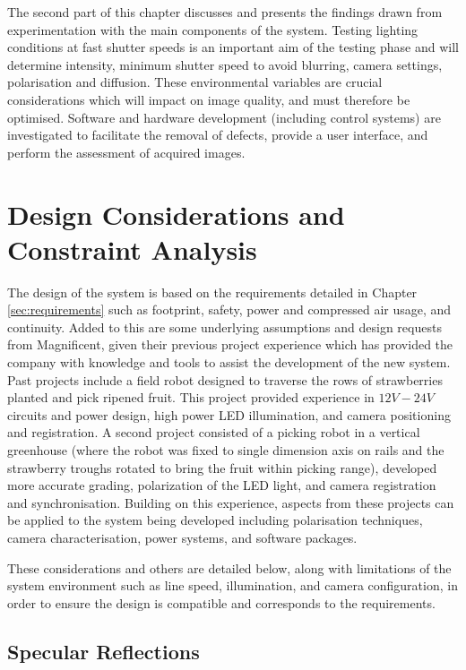 \documentclass[fleqn,twoside,12pt]{report}
\begin{document}
The second part of this chapter discusses and presents the findings drawn from experimentation with the main components of the system. Testing lighting conditions at fast shutter speeds is an important aim of the testing phase and will determine intensity, minimum shutter speed to avoid blurring, camera settings, polarisation and diffusion. These environmental variables are crucial considerations which will impact on image quality, and must therefore be optimised. Software and hardware development (including control systems) are investigated to facilitate the removal of defects, provide a user interface, and perform the assessment of acquired images.


\section{Design Considerations and Constraint Analysis}
\label{sec:challenges}


The design of the system is based on the requirements detailed in Chapter \ref{sec:requirements} such as footprint, safety, power and compressed air usage, and continuity. Added to this are some underlying assumptions and design requests from Magnificent, given their previous project experience which has provided the company with knowledge and tools to assist the development of the new system. Past projects include a field robot designed to traverse the rows of strawberries planted and pick ripened fruit. This project provided experience in $12V-24V$ circuits and power design, high power LED illumination, and camera positioning and registration. A second project consisted of a picking robot in a vertical greenhouse (where the robot was fixed to single dimension axis on rails and the strawberry troughs rotated to bring the fruit within picking range), developed more accurate grading, polarization of the LED light, and camera registration and synchronisation. Building on this experience, aspects from these projects can be applied to the system being developed including polarisation techniques, camera characterisation, power systems, and software packages.

These considerations and others are detailed below, along with limitations of the system environment such as line speed, illumination, and camera configuration, in order to ensure the design is compatible and corresponds to the requirements. 


\subsection{Specular Reflections}
\end{document}
